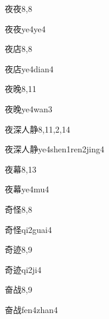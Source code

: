 \begin{entry}{夜夜}{8,8}
  \begin{phonetics}{夜夜}{ye4ye4}
  \end{phonetics}
\end{entry}

\begin{entry}{夜店}{8,8}
  \begin{phonetics}{夜店}{ye4dian4}
  \end{phonetics}
\end{entry}

\begin{entry}{夜晚}{8,11}
  \begin{phonetics}{夜晚}{ye4wan3}
  \end{phonetics}
\end{entry}

\begin{entry}{夜深人静}{8,11,2,14}
  \begin{phonetics}{夜深人静}{ye4shen1ren2jing4}
  \end{phonetics}
\end{entry}

\begin{entry}{夜幕}{8,13}
  \begin{phonetics}{夜幕}{ye4mu4}
  \end{phonetics}
\end{entry}

\begin{entry}{奇怪}{8,8}
  \begin{phonetics}{奇怪}{qi2guai4}
  \end{phonetics}
\end{entry}

\begin{entry}{奇迹}{8,9}
  \begin{phonetics}{奇迹}{qi2ji4}
  \end{phonetics}
\end{entry}

\begin{entry}{奋战}{8,9}
  \begin{phonetics}{奋战}{fen4zhan4}
  \end{phonetics}
\end{entry}

